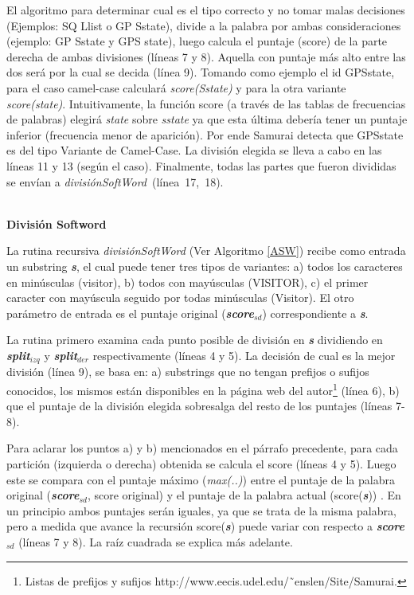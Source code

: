 El algoritmo para determinar cual es el tipo correcto y no tomar malas decisiones (Ejemplos: \textsf{SQ Llist} o \textsf{GP Sstate}), divide a la palabra por ambas consideraciones (ejemplo: \textsf{GP Sstate} y \textsf{GPS state}), luego calcula el puntaje (score) de la parte derecha de ambas divisiones (líneas 7 y 8). Aquella con puntaje más alto entre las dos será por la cual se decida (línea 9). Tomando como ejemplo el id \textsf{GPSstate}, para el caso camel-case calculará \mbox{\textit{score(Sstate)}} y para la otra variante \textit{score(state)}. Intuitivamente, la función score (a través de las tablas de frecuencias de palabras) elegirá \textit{state} sobre \textit{sstate} ya que esta última debería tener un puntaje inferior (frecuencia menor de aparición). Por ende Samurai detecta que \textsf{GPSstate} es del tipo Variante de Camel-Case. La división elegida se lleva a cabo en las líneas 11 y 13 (según el caso).
Finalmente, todas las partes que fueron divididas se envían a \mbox{\textit{divisiónSoftWord} (línea 17, 18)}.

\noindent \textbf{\\División Softword\\}

La rutina recursiva \textit{divisiónSoftWord} (Ver Algoritmo \ref{ASW}) recibe como entrada un substring \textbf{\textit{s}}, el cual puede tener tres tipos de variantes: a) todos los caracteres en minúsculas (\textsf{visitor}), b) todos con mayúsculas (\textsf{VISITOR}), c) el primer caracter con mayúscula seguido por todas minúsculas (\textsf{Visitor}). El otro parámetro de entrada es el puntaje original (\textbf{\textit{score$_{sd}$}}) correspondiente a \textbf{\textit{s}}.

La rutina primero examina cada punto posible de división en \textbf{\textit{s}} dividiendo en \textbf{\textit{split$_{izq}$}} y \textbf{\textit{split$_{der}$}} respectivamente (líneas 4 y 5). La decisión de cual es la mejor división (línea 9), se basa en: a) substrings que no tengan prefijos o sufijos conocidos, los mismos están disponibles en la página web del autor\footnote[1]{Listas de prefijos y sufijos  http://www.eecis.udel.edu/˜enslen/Site/Samurai.} (línea 6), b) que el puntaje de la división elegida sobresalga del resto de los puntajes (líneas 7-8).

Para aclarar los puntos a) y b) mencionados en el párrafo precedente, para cada partición (izquierda o derecha) obtenida se calcula el score (líneas 4 y 5). Luego este se compara con el puntaje máximo (\textit{max(..)}) entre el puntaje de la palabra original (\textbf{\textit{score$_{sd}$}}, score original) y el puntaje de la palabra actual (score(\textbf{\textit{s}})) . En un principio ambos puntajes serán iguales, ya que se trata de la misma palabra, pero a medida que avance la recursión score(\textbf{\textit{s}}) puede variar con respecto a \textbf{\textit{score$_{sd}$}} (líneas 7 y 8). La raíz cuadrada se explica más adelante.

